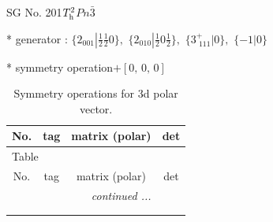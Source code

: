\documentclass[fleqn,8pt]{jsarticle}
\begin{document}
\setcounter{MaxMatrixCols}{32}

\renewcommand{\tablename}{Table~}
\renewcommand{\figurename}{Figure~}
\begin{center}
\LARGE
SG No. 201\quad$T_{\rm h}^{2}$\quad$Pn\bar{3}$\quad[ cubic ]
\end{center}

* generator : $\{2{}_{001}|\frac{1}{2} \frac{1}{2} 0\},\,\,\{2{}_{010}|\frac{1}{2} 0 \frac{1}{2}\},\,\,\{3^{+}_{\,\,111}|0\},\,\,\{-1|0\}$

* symmetry operation\quad$+\left[ 0,\, 0,\, 0 \right]$
\renewcommand{\arraystretch}{1.3}
\begin{longtable}{cccc}
\caption{Symmetry operations for 3d polar vector.}
 \\
 \hline \hline
No. & tag & matrix (polar) & det \\ \hline \endfirsthead

\multicolumn{3}{l}{\tablename\ \thetable{}} \\
 \hline \hline
No. & tag & matrix (polar) & det \\ \hline \endhead

 \hline \hline
\multicolumn{3}{r}{\footnotesize\it continued ...} \\ \endfoot

 \hline \hline
\multicolumn{3}{r}{} \\ \endlastfoot


\end{longtable}
\end{document}
